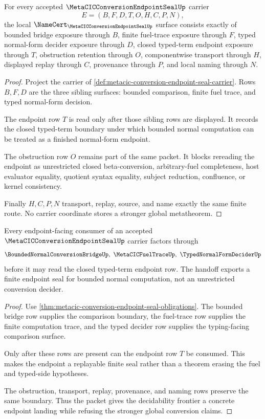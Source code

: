 \begin{theorem}
\label{thm:metacic-conversion-endpoint-seal-obligations}
For every accepted $\MetaCICConversionEndpointSealUp$ carrier
$$
E=(B,F,D,T,O,H,C,P,N),
$$
the local $\NameCert_{\MetaCICConversionEndpointSealUp}$ surface consists exactly of bounded bridge exposure through $B$, finite fuel-trace exposure through $F$, typed normal-form decider exposure through $D$, closed typed-term endpoint exposure through $T$, obstruction retention through $O$, componentwise transport through $H$, displayed replay through $C$, provenance through $P$, and local naming through $N$.
\end{theorem}
\begin{proof}
Project the carrier of \autoref{def:metacic-conversion-endpoint-seal-carrier}. Rows $B,F,D$ are the three sibling surfaces: bounded comparison, finite fuel trace, and typed normal-form decision.

The endpoint row $T$ is read only after those sibling rows are displayed. It records the closed typed-term boundary under which bounded normal computation can be treated as a finished normal-form endpoint.

The obstruction row $O$ remains part of the same packet. It blocks rereading the endpoint as unrestricted closed beta-conversion, arbitrary-fuel completeness, host evaluator equality, quotient syntax equality, subject reduction, confluence, or kernel consistency.

Finally $H,C,P,N$ transport, replay, source, and name exactly the same finite route. No carrier coordinate stores a stronger global metatheorem.
\end{proof}

\begin{theorem}
\label{thm:metacic-conversion-endpoint-seal-handoff}
Every endpoint-facing consumer of an accepted $\MetaCICConversionEndpointSealUp$ carrier factors through
$$
\BoundedNormalConversionBridgeUp,\ \MetaCICFuelTraceUp,\ \TypedNormalFormDeciderUp
$$
before it may read the closed typed-term endpoint row. The handoff exports a finite endpoint seal for bounded normal computation, not an unrestricted conversion decider.
\end{theorem}
\begin{proof}
Use \autoref{thm:metacic-conversion-endpoint-seal-obligations}. The bounded bridge row supplies the comparison boundary, the fuel-trace row supplies the finite computation trace, and the typed decider row supplies the typing-facing comparison surface.

Only after these rows are present can the endpoint row $T$ be consumed. This makes the endpoint a replayable finite seal rather than a theorem erasing the fuel and typed-side hypotheses.

The obstruction, transport, replay, provenance, and naming rows preserve the same boundary. Thus the packet gives the decidability frontier a concrete endpoint landing while refusing the stronger global conversion claims.
\end{proof}


